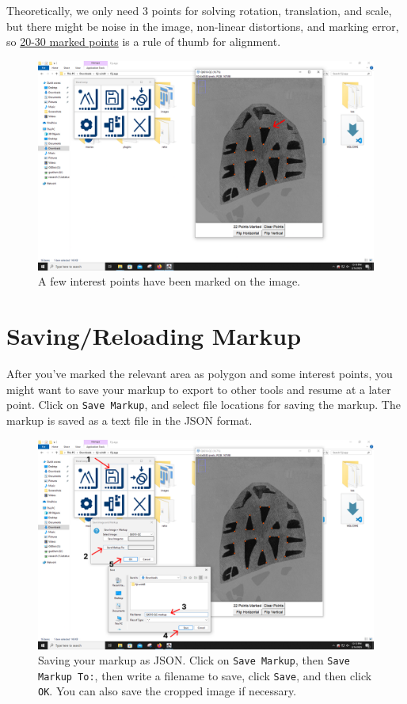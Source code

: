 \documentclass{csafedoc}
\begin{document}
Theoretically, we only need 3 points for solving rotation, translation, and scale,
but there might be noise in the image, non-linear distortions, and marking error, so
\underline{20-30 marked points} is a rule of thumb for alignment.

\begin{figure}[H]
	\begin{center}
		\includegraphics[width=0.8\linewidth]{images/step_4e-anno.png}
	\end{center}
	\caption{A few interest points have been marked on the image.}
	\label{fig:step4e}
\end{figure}

\section{Saving/Reloading Markup}

After you've marked the relevant area as polygon and some interest points, you might want
to save your markup to export to other tools and resume at a later point. Click on
\texttt{Save Markup}, and select file locations for saving the markup. The markup is saved
as a text file in the JSON format.

\begin{figure}[H]
	\begin{center}
		\includegraphics[width=0.8\linewidth]{images/step_5a-anno.png}
	\end{center}
	\caption{Saving your markup as JSON. Click on \texttt{Save Markup}, then \texttt{Save
			Markup To:}, then write a filename to save, click \texttt{Save}, and then click
		\texttt{OK}. You can also save the cropped image if necessary.}
	\label{fig:step5a}
\end{figure}
\end{document}
